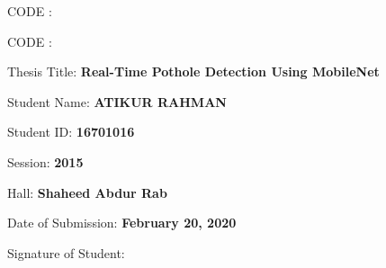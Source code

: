 \clearpage
{}
\begin{titlepage}
    \linespread{1.25}
    \begin{large}
    \begin{minipage}[t][\textheight][t]{0.38\textwidth}
        CODE :
    \end{minipage}
    \hfill \vrule \hfill
    \hspace*{0.02\textwidth}
    \begin{minipage}[t][\textheight][t]{0.52\textwidth}
        CODE : 
        
        \vfill\raggedright
        Thesis Title: {\Large\textbf{Real-Time Pothole Detection Using MobileNet}}
        
        \vfill
        Student Name: \textbf{ATIKUR RAHMAN}
        
        \vspace{5mm}
        Student ID: \textbf{16701016}
        
        \vspace{5mm}
        Session: \textbf{2015}
        
        \vspace{5mm}
        Hall: \textbf{Shaheed Abdur Rab}
        
        \vspace{5mm}
        Date of Submission: \textbf{February 20, 2020}
        
        \vspace{5mm}
        Signature of Student:
        
        \vspace{1cm}
        \makebox[\linewidth]{\dotfill}
    \end{minipage}
    \end{large}
\end{titlepage}
\restoregeometry
